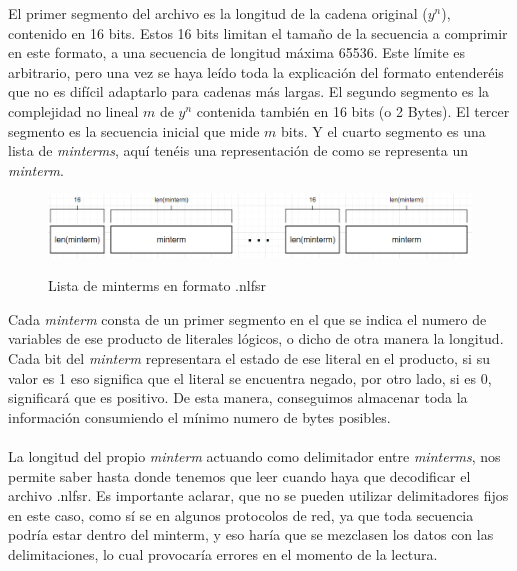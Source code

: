 \noindent El primer segmento del archivo es la longitud de la cadena original ($y^n$), contenido en 16 bits. Estos 16 bits limitan el tamaño de la secuencia a comprimir en este formato, a una secuencia de longitud máxima 65536. Este límite es arbitrario, pero una vez se haya leído toda la explicación del formato entenderéis que no es difícil adaptarlo para cadenas más largas.  El segundo segmento es la complejidad no lineal $m$ de $y^n$ contenida también en 16 bits (o 2 Bytes). El tercer segmento es la secuencia inicial que mide $m$ bits. Y el cuarto segmento es una lista de \textit{minterms}, aquí tenéis una representación de como se representa un \textit{minterm}.
\\
\begin{figure}[h] %
    \centering
    \includegraphics[width=\textwidth,keepaspectratio]{img/nlfsrformat_02.png} %
    \parbox{\linewidth}{\centering Lista de minterms en formato .nlfsr}
    \label{fig:mi_imagen} %
\end{figure}
\noindent Cada \textit{minterm} consta de un primer segmento en el que se indica el numero de variables de ese producto de literales lógicos, o dicho de otra manera la longitud. Cada bit del \textit{minterm} representara el estado de ese literal en el producto, si su valor es 1 eso significa que el literal se encuentra negado, por otro lado, si es 0, significará que es positivo. De esta manera, conseguimos almacenar toda la información consumiendo el mínimo numero de bytes posibles. \\\\
La longitud del propio \textit{minterm} actuando como delimitador entre \textit{minterms}, nos permite saber hasta donde tenemos que leer cuando haya que decodificar el archivo .nlfsr. Es importante aclarar, que no se pueden utilizar delimitadores fijos en este caso, como sí se en algunos protocolos de red, ya que toda secuencia podría estar dentro del minterm, y eso haría que se mezclasen los datos con las delimitaciones, lo cual provocaría errores en el momento de la lectura.
\\\\

